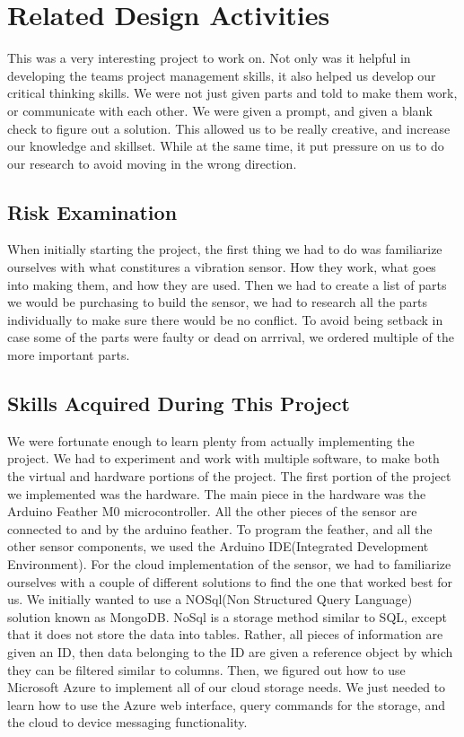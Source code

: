\documentclass[11pt]{article}
\begin{document}
\section{Related Design Activities}

This was a very interesting project to work on. Not only was it helpful in developing the teams project management skills, it also helped us develop our critical thinking skills. We were not just given parts and told to make them work, or communicate with each other. We were given a prompt, and given a blank check to figure out a solution. This allowed us to be really creative, and increase our knowledge and skillset. While at the same time, it put pressure on us to do our research to avoid moving in the wrong direction.

\subsection{Risk Examination}

{When initially starting the project, the first thing we had to do was familiarize ourselves with what constitures a vibration sensor. How they work, what goes into making them, and how they are used. Then we had to create a list of parts we would be purchasing to build the sensor, we had to research all the parts individually to make sure there would be no conflict. To avoid being setback in case some of the parts were faulty or dead on arrrival, we ordered multiple of the more important parts. } 

\subsection{Skills Acquired During This Project}
{We were fortunate enough to learn plenty from actually implementing the project. We had to experiment and work with multiple software, to make both the virtual and hardware portions of the project. The first portion of the project we implemented was the hardware. The main piece in the hardware was the Arduino Feather M0 microcontroller. All the other pieces of the sensor are connected to and by the arduino feather. To program the feather, and all the other sensor components, we used the Arduino IDE(Integrated Development Environment). For the cloud implementation of the sensor, we had to familiarize ourselves with a couple of different solutions to find the one that worked best for us. We initially wanted to use a NOSql(Non Structured Query Language) solution known as MongoDB. NoSql is a storage method similar to SQL, except that it does not store the data into tables. Rather, all pieces of information are given an ID, then data belonging to the ID are given a reference object by which they can be filtered similar to columns.  Then, we figured out how to use Microsoft Azure to implement all of our cloud storage needs. We just needed to learn how to use the Azure web interface, query commands for the storage, and the cloud to device messaging functionality.}
\end{document}
